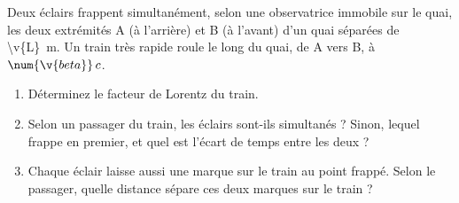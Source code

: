 Deux éclairs frappent simultanément, selon une observatrice immobile sur le quai, les deux extrémités A (à l'arrière) et B (à l'avant) d'un quai séparées de \qty{\v{L}}{m}. Un train très rapide roule le long du quai, de A vers B, à $\num{\v{beta}}\,c$.

\begin{enumerate}[label=\alph*)]
    \item Déterminez le facteur de Lorentz du train.
    \item Selon un passager du train, les éclairs sont-ils simultanés ? Sinon, lequel frappe en premier, et quel est l'écart de temps entre les deux ?
    \item Chaque éclair laisse aussi une marque sur le train au point frappé. Selon le passager, quelle distance sépare ces deux marques sur le train ?
\end{enumerate}

